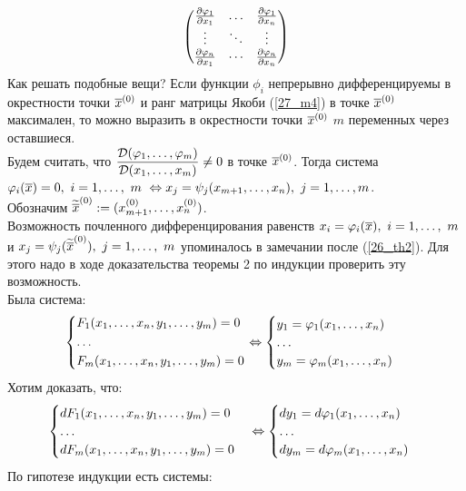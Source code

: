 \begin{note}
	\begin{equation}\label{27_m4}
		\begin{pmatrix}
			\frac{\partial \varphi_1}{\partial x_1} & \dots & \frac{\partial \varphi_1}{\partial x_n} \\
			\vdots & \ddots & \vdots \\
			\frac{\partial \varphi_n}{\partial x_1} & \cdots & \frac{\partial \varphi_n}{\partial x_n}
		\end{pmatrix}
	\end{equation}
	Как решать подобные вещи? Если функции $\phi_i$ непрерывно дифференцируемы в окрестности точки $\overline x^{({0})}$ и ранг матрицы Якоби (\ref{27_m4}) в точке $\overline x^{({0})}$ максимален, то можно выразить в окрестности точки $\overline x^{({0})}$ $m$ переменных через оставшиеся.\\
	Будем считать, что $\displaystyle\frac{\mathcal D(\varphi_1,\dots,\varphi_m)}{\mathcal D(x_1,\dots,x_m)}\ne0$ в точке $\overline x^{({0})}$. Тогда система $\varphi_i(\overline x)=0,\ i=1,\dots,\ m\ \Leftrightarrow x_j=\psi_j(x_{m+1},\dots,x_n),\ j=1,\dots,m$.\\
	Обозначим $\widetilde{\overline x}^{({0})}:=(x_{m+1}^{({0})},\dots,x_n^{({0})})$.\\
	Возможность почленного дифференцирования равенств $x_i=\varphi_i(\overline x),\ i=1,\dots,\ m$ и $x_j=\psi_j(\widetilde{\overline x}^{({0})}),\ j=1,\dots,\ m$ упоминалось в замечании после (\ref{26_th2}). Для этого надо в ходе доказательства теоремы 2 по индукции проверить эту возможность.\\
	Была система:
	\[
	\begin{cases*}
		F_1(x_1,\dots,x_n,y_1,\dots,y_m)=0\\
		\dots\\
		F_m(x_1,\dots,x_n,y_1,\dots,y_m)=0
	\end{cases*}
	\lra
	\begin{cases}
		y_1=\phi_1(x_1,\dots,x_n)\\
		\dots\\
		y_m=\phi_m(x_1,\dots,x_n)
	\end{cases}
	\]
	Хотим доказать, что:
	\[
	\begin{cases}
		dF_1(x_1,\dots,x_n,y_1,\dots,y_m)=0\\
		\dots\\
		dF_m(x_1,\dots,x_n,y_1,\dots,y_m)=0
	\end{cases}
	\Leftrightarrow
	\begin{cases}
		dy_1=d\varphi_1(x_1,\dots,x_n)\\
		\dots\\
		dy_m=d\varphi_m(x_1,\dots,x_n)
	\end{cases}
	\]
	По гипотезе индукции есть системы:

\end{note}
